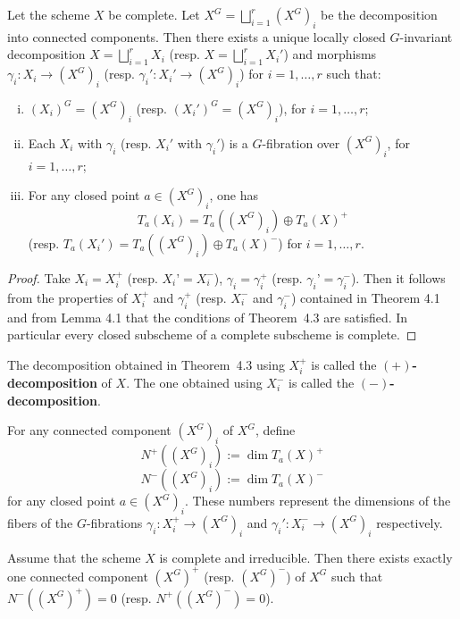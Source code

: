 \documentclass[12pt]{article}
\begin{document}
\begin{theorem}[Theorem 4.3]
Let the scheme $X$ be complete. Let $X^G = \bigsqcup_{i=1}^r (X^G)_i$ be the decomposition into connected components. Then there exists a unique locally closed $G$-invariant decomposition $X = \bigsqcup_{i=1}^r X_i$ (resp. $X = \bigsqcup_{i=1}^r X_i'$) and morphisms $\gamma_i : X_i \to (X^G)_i$ (resp. $\gamma_i' : X_i' \to (X^G)_i$) for $i = 1, \dots, r$ such that:

\begin{enumerate}[(i)]
\item $(X_i)^G = (X^G)_i$ (resp. $(X_i')^G = (X^G)_i$), for $i = 1, \dots, r$;
\item Each $X_i$ with $\gamma_i$ (resp. $X_i'$ with $\gamma_i'$) is a $G$-fibration over $(X^G)_i$, for $i = 1, \dots, r$;
\item For any closed point $a \in (X^G)_i$, one has \[T_a(X_i) = T_a((X^G)_i) \oplus T_a(X)^+\] (resp. $T_a(X_i') = T_a((X^G)_i) \oplus T_a(X)^-$) for $i = 1, \dots, r$.
\end{enumerate}
\end{theorem}

\begin{proof}
Take $X_i = X_i^+$ (resp. $X_i’ = X_i^-$), $\gamma_i = \gamma_i^+$ (resp. $\gamma_i’ = \gamma_i^-$). Then it follows from the properties of $X_i^+$ and $\gamma_i^+$ (resp. $X_i^-$ and $\gamma_i^-$) contained in Theorem 4.1 and from Lemma 4.1 that the conditions of Theorem~4.3 are satisfied. In particular every closed subscheme of a complete subscheme is complete.
\end{proof}


\begin{definition}
   The decomposition obtained in Theorem~4.3 using $X_i^+$ is called the \textbf{$(+)$-decomposition} of $X$. The one obtained using $X_i^-$ is called the \textbf{$(-)$-decomposition}.

For any connected component $(X^G)_i$ of $X^G$, define \[N^+((X^G)_i) := \dim T_a(X)^+\]\[N^-((X^G)_i) := \dim T_a(X)^-\] for any closed point $a \in (X^G)_i$. These numbers represent the dimensions of the fibers of the $G$-fibrations $\gamma_i : X_i^+ \to (X^G)_i$ and $\gamma_i' : X_i^- \to (X^G)_i$ respectively.

\end{definition}

\begin{corollary}[Corollary 4.1]
Assume that the scheme $X$ is complete and irreducible. Then there exists exactly one connected component $(X^G)^+$ (resp. $(X^G)^-$) of $X^G$ such that $N^-((X^G)^+) = 0$ (resp. $N^+((X^G)^-) = 0$).
\end{corollary}
\end{document}
